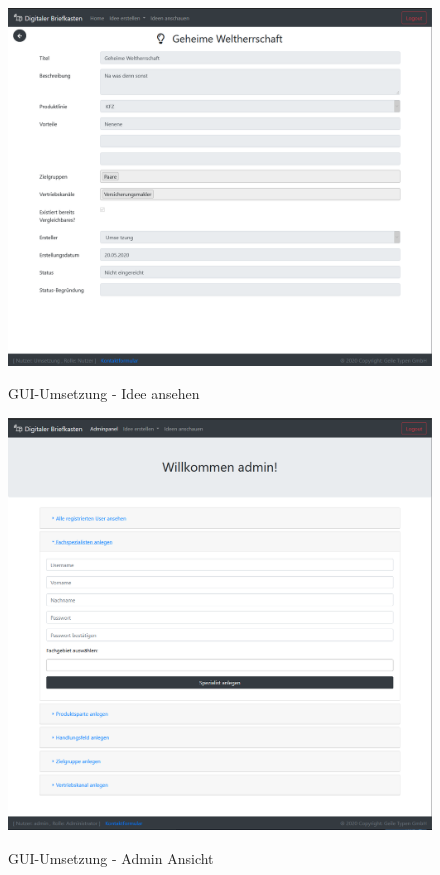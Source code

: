 \begin{figure}[h]
    \centering
    \begin{minipage}[t]{1\textwidth}
        \caption{GUI-Umsetzung - Idee ansehen }
        \includegraphics[width=1\textwidth]{img/idee-umsetzung.png}\\
    \end{minipage}
\end{figure}

\begin{figure}[h]
    \centering
    \begin{minipage}[t]{1\textwidth}
        \caption{GUI-Umsetzung - Admin Ansicht }
        \includegraphics[width=1\textwidth]{img/admin-umsetzung.png}\\
    \end{minipage}
\end{figure}


